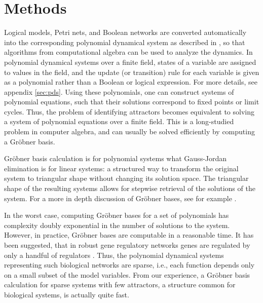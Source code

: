 \documentclass[10pt]{bmc_article}
\newenvironment{bmcformat}{\fussy\setboolean{publ}{true}}{\fussy}
\begin{document}
\begin{bmcformat}
\section*{Methods}
Logical models, Petri nets, and Boolean networks are converted automatically
into the corresponding polynomial dynamical system as described in
\cite{Alan:Bioinf2010}, so that algorithms from computational
algebra can be used to analyze the dynamics. In polynomial dynamical systems over a finite field, states of a variable are assigned to values in the field, and the update (or transition) rule for each variable is given as a polynomial rather than a Boolean or logical expression. For more details, see appendix \ref{sec:pds}. Using these polynomials, one can construct systems of polynomial equations, such that their solutions correspond to fixed points or limit cycles. Thus, the problem of identifying attractors becomes equivalent to solving a system of polynomial equations over a finite field. This is a long-studied problem in computer algebra, and can usually be solved efficiently by computing a Gr\"obner basis.

Gr\"obner basis calculation is for polynomial systems what
Gauss-Jordan elimination is for linear systems: a structured way to transform
the original system to triangular shape without changing its solution space.
The triangular shape of the resulting systems allows for stepwise retrieval of the solutions of the system. For a more in depth discussion of Gr\"obner bases, see for example \cite{IVA}.

In the worst case, computing Gr\"obner bases for a set of polynomials has
complexity doubly exponential in the number of solutions to the system.
However, in practice, Gr\"{o}bner bases are computable in a reasonable time. It has been suggested, that in robust gene
regulatory networks genes are regulated by only a handful of regulators
\cite{Leclerc:2008}. Thus, the polynomial dynamical systems representing such biological networks are
sparse, i.e., each function depends only on a small subset of the model variables. From our experience, a Gr\"obner basis calculation 
for sparse systems with few attractors, a structure common for
biological systems, is actually quite fast. 

%
%
%



\end{bmcformat}
\end{document}
